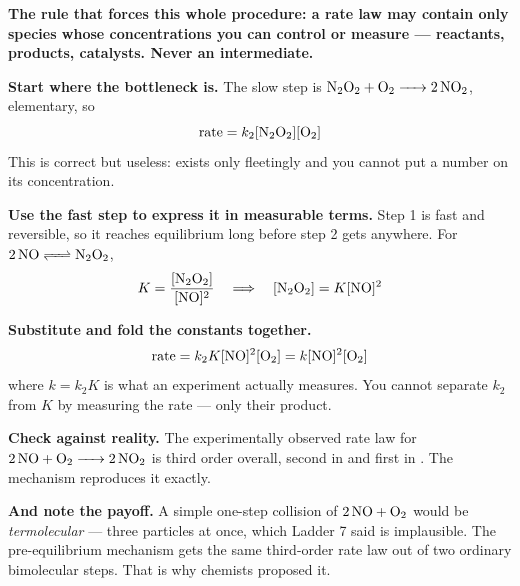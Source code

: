 \documentclass{apchem-worksheet}
\begin{document}
\begin{center}
\end{center}

\begin{workedexample}
\textbf{The rule that forces this whole procedure: a rate law may
contain only species whose concentrations you can control or measure ---
reactants, products, catalysts. Never an intermediate.}

\textbf{Start where the bottleneck is.} The slow step is
$\ce{N2O2 + O2 -> 2NO2}$, elementary, so
\[ \text{rate} = k_{2}[\ce{N2O2}][\ce{O2}] \]
This is correct but useless:  exists only fleetingly and you
cannot put a number on its concentration.

\textbf{Use the fast step to express it in measurable terms.} Step 1 is
fast and reversible, so it reaches equilibrium long before step 2 gets
anywhere. For $\ce{2NO <=> N2O2}$,
\[ K = \frac{[\ce{N2O2}]}{[\ce{NO}]^{2}}
   \quad\Longrightarrow\quad
   [\ce{N2O2}] = K[\ce{NO}]^{2} \]

\textbf{Substitute and fold the constants together.}
\[ \text{rate} = k_{2}K[\ce{NO}]^{2}[\ce{O2}]
               = k[\ce{NO}]^{2}[\ce{O2}] \]
where $k = k_{2}K$ is what an experiment actually measures. You cannot
separate $k_{2}$ from $K$ by measuring the rate --- only their product.

\textbf{Check against reality.} The experimentally observed rate law for
$\ce{2NO + O2 -> 2NO2}$ is third order overall, second in  and
first in . The mechanism reproduces it exactly.

\textbf{And note the payoff.} A simple one-step collision of
$\ce{2NO + O2}$ would be \emph{termolecular} --- three particles at
once, which Ladder 7 said is implausible. The pre-equilibrium mechanism
gets the same third-order rate law out of two ordinary bimolecular
steps. That is why chemists proposed it.
\end{workedexample}
\end{document}
